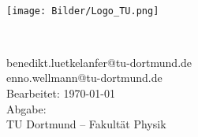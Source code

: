 \begin{titlingpage}
    \begin{center}
        \begin{Huge}
            \textbf{\thetitle\\}
        \end{Huge}
    \end{center}
    \vspace{4cm}
    \texttt{[image: Bilder/Logo\_TU.png]} \\
    \vspace{4cm}
    \begin{center}
        \begin{huge}
            \theauthor\\
        \end{huge}
        \vspace{0.5cm}
        \begin{Large}
            benedikt.luetkelanfer@tu-dortmund.de\\
            enno.wellmann@tu-dortmund.de\\
            \vspace{1.4cm}
            Bearbeitet: \today\\
            Abgabe: \thedate\\
            TU Dortmund – Fakultät Physik\\
        \end{Large}
    \end{center}
\end{titlingpage}